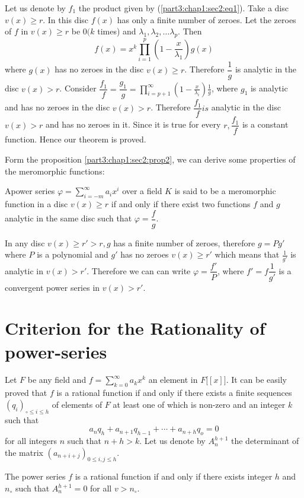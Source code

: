 Let us denote by $f_1$ the product given by
(\ref{part3:chap1:sec2:eq1}). Take a disc 
$v(x)\geq r$. In this disc $f(x)$ has only a finite number of
zeroes. Let the zeroes of $f$ in $v(x)\geq r$ be $0(k$ times) and
$\lambda_1,\lambda_2,\ldots\lambda_p$. Then  
$$
f(x)=x^k \prod^p_{i=1}\left(1-\frac{x}{\lambda_1}\right) g(x)
$$
where $g(x)$ has no zeroes in the disc $v(x)\geq r$. Therefore
$\dfrac{1}{g}$ is analytic in the disc $v(x)>r$. Consider
$\dfrac{f_1}{f}=\dfrac{g_1}{g}= \prod_{i=p+1}^\infty \left( 1-
\frac{x}{\lambda_i}\right) \frac{1}{g}$, where $g_1$ is analytic and has no
zeroes in the disc $v(x)>r$. Therefore $\dfrac{f_1}{f} is $ analytic
in the disc $v(x) > r$ and has no zeroes in it. Since it is true for
every $r, \dfrac{f_1}{f}$ is a constant function. Hence our theorem is
proved.  

Form  the proposition \ref{part3:chap1:sec2:prop2}, we can derive some
properties of the meromorphic functions: 
\begin{defi*}
  A\pageoriginale power series $\varphi =\sum\limits_{i=-m}^{\infty}
  a_ix^i$ over a 
  field $K$ is said to be a meromorphic function in a disc $v(x)\geq r$
  if and only if there exist two functions $f$ and $g$ analytic in the
  same disc such that $\varphi =\dfrac{f}{g}$. 
\end{defi*}

In any disc $v(x)\geq r' > r, g$ has a finite number of zeroes,
therefore $g=P g'$ where $P$ is a polynomial and $g'$ has no zeroes
 $ v(x) \geq r'$ which means that $\frac{1}{g'}$ is analytic in $v(x)>
r'$. Therefore we can can write $\varphi = \dfrac{f'}{P}$, where
$f'=f \dfrac{1}{g'}$ is a convergent power series in $v(x)>r'$. 

\section{Criterion for the Rationality of power-series}\label{part3:chap1:sec3}

Let $F$ be any field and $f=\sum^{\infty}_{k=0} a_kx^k$ an element in
$F\big[[x]\big]$. It can be easily proved that $f$ is a rational
function if and only if there exists a finite sequences $(q_i)_{\circ
  \leq i \leq h}$ of elements of $F$ at least one of which is non-zero
and an integer $k$ such that  
$$
a_n q_h+a_{n+1} q_{h-1} + \cdots +a_{n+h} q_o=0
$$
for all integers $n$ such that $n+h>k$. Let us denote by $A^{h+1}_n$
the determinant of the matrix $(a_{n+i+j})_{0\leq i, j\leq h}$. 

\setcounter{Lemma}{0}
\begin{Lemma}\label{part3:chap1:sec3:lem1}
  The power series $f$ is a rational function if and only if there
  exists integer $h$ and $n_{\circ}$ such that $A_n^{h+1}=0$ for all
  $v > n_\circ$. 
\end{Lemma}

